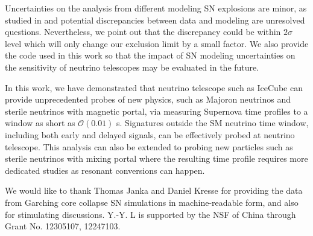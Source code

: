 Uncertainties on the analysis from different modeling SN explosions are minor, as studied in \cite{li2023old} and potential discrepancies between data and modeling are unresolved questions.
Nevertheless, we point out that the discrepancy could be within $2\sigma$ level which will only change our exclusion limit by a small factor. We also provide the code used in this work so that the impact of SN modeling uncertainties on the sensitivity of neutrino telescopes may be evaluated in the future.

In this work, we have demonstrated that neutrino telescope such as IceCube can provide unprecedented probes of new physics, such as Majoron neutrinos and sterile neutrinos with magnetic portal, via measuring Supernova time profiles to a window as short as $\mathcal{O}(0.01)$ s. Signatures outside the SM neutrino time window, including both early and delayed signals, can be effectively probed at neutrino telescope.
This analysis can also be extended to probing new particles such as sterile neutrinos with mixing portal where the resulting time profile requires more dedicated studies as resonant conversions can happen. 

\begin{acknowledgments}
We would like to thank Thomas Janka and Daniel Kresse for providing the data from Garching core collapse SN simulations in machine-readable form, and also for stimulating discussions. Y.-Y. L is supported by the NSF of China through Grant No. 12305107, 12247103.
\end{acknowledgments}
